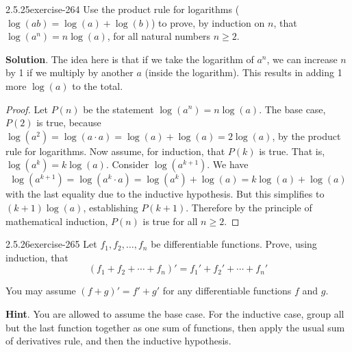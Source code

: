 \documentclass[twoside,11pt,]{book}
\numberwithin{equation}{chapter}
\begin{document}
\begin{divisionsolution}{2.5.25}{}{exercise-264}%
\hypertarget{p-3689}{}%
Use the product rule for logarithms (\(\log(ab) = \log(a) + \log(b)\)) to prove, by induction on \(n\), that \(\log(a^n) = n \log(a)\), for all natural numbers \(n \ge 2\).%
\par\smallskip%
\noindent\textbf{Solution}.\quad%
\hypertarget{p-3690}{}%
The idea here is that if we take the logarithm of \(a^n\), we can increase \(n\) by 1 if we multiply by another \(a\) (inside the logarithm). This results in adding 1 more \(\log(a)\) to the total.%
\begin{proof}{}
\hypertarget{p-3691}{}%
Let \(P(n)\) be the statement \(\log(a^n) = n \log(a)\). The base case, \(P(2)\) is true, because \(\log(a^2) = \log(a\cdot a) = \log(a) + \log(a) = 2\log(a)\), by the product rule for logarithms. Now assume, for induction, that \(P(k)\) is true. That is, \(\log(a^k) = k\log(a)\). Consider \(\log(a^{k+1})\). We have%
\begin{equation*}
\log(a^{k+1}) = \log(a^k\cdot a) = \log(a^k) + \log(a) = k\log(a) + \log(a)
\end{equation*}
with the last equality due to the inductive hypothesis. But this simplifies to \((k+1) \log(a)\), establishing \(P(k+1)\). Therefore by the principle of mathematical induction, \(P(n)\) is true for all \(n \ge 2\).%
\end{proof}
\end{divisionsolution}%
\begin{divisionsolution}{2.5.26}{}{exercise-265}%
\hypertarget{p-3692}{}%
Let \(f_1, f_2,\ldots, f_n\) be differentiable functions. Prove, using induction, that%
\begin{equation*}
(f_1 + f_2 + \cdots + f_n)' = f_1' + f_2' + \cdots + f_n'
\end{equation*}
%
\par
\hypertarget{p-3693}{}%
You may assume \((f+g)' = f' + g'\) for any differentiable functions \(f\) and \(g\).%
\par\smallskip%
\noindent\textbf{Hint}.\quad%
\hypertarget{p-3694}{}%
You are allowed to assume the base case. For the inductive case, group all but the last function together as one sum of functions, then apply the usual sum of derivatives rule, and then the inductive hypothesis.%
\end{divisionsolution}%
\end{document}
